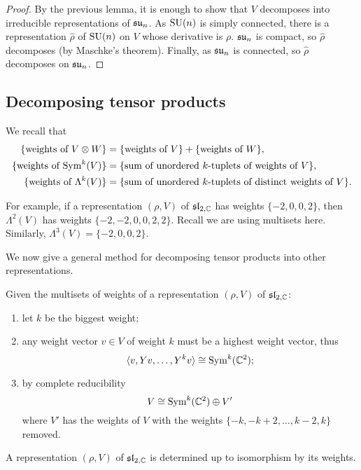 \begin{proof}
    By the previous lemma, it is enough to show that $V$ decomposes into irreducible representations of $\su[n]$. As $\SU(n)$ is simply connected, there is a representation $\hat\rho$ of $\SU(n)$ on $V$ whose derivative is $\rho$. $\su[n]$ is compact, so $\hat\rho$ decomposes (by Maschke's theorem). Finally, as $\su[n]$ is connected, so $\hat\rho$ decomposes on $\su[n]$.
\end{proof}

\subsection{Decomposing tensor products}

We recall that
\begin{align*}
    \{\text{weights of $V \otimes W$}\}
     & = \{\text{weights of $V$}\} + \{\text{weights of $W$}\},              \\
    \{\text{weights of $\Sym^k(V)$}\}
     & = \{\text{sum of unordered $k$-tuplets of weights of $V$}\},          \\
    \{\text{weights of $\Lambda^k(V)$}\}
     & = \{\text{sum of unordered $k$-tuplets of distinct weights of $V$}\}. \\
\end{align*}

For example, if a representation $(\rho, V)$ of $\sltwo$ has weights $\{-2,0,0,2\}$, then $\Lambda^2(V)$ has weights
$\{-2,-2,0,0,2,2\}$. Recall we are using multisets here. Similarly, $\Lambda^3(V) = \{-2,0,0,2\}$.

We now give a general method for decomposing tensor products into other representations.

Given the multisets of weights of a representation $(\rho, V)$ of $\sltwo$:
\begin{enumerate}
    \item let $k$ be the biggest weight;
    \item any weight vector $v \in V$ of weight $k$ must be a highest weight vector, thus
          \[ \langle v, Yv, \ldots, Y^kv \rangle \cong \Sym^k(\mathbb C^2); \]
    \item by complete reducibility
          \[ V \cong \Sym^k(\mathbb C^2) \oplus V' \]
          where $V'$ has the weights of $V$ with the weights $\{-k, -k+2, \ldots, k-2, k\}$ removed.
\end{enumerate}

\begin{theorem}
    A representation $(\rho, V)$ of $\sltwo$ is determined up to isomorphism by its weights.
\end{theorem}

